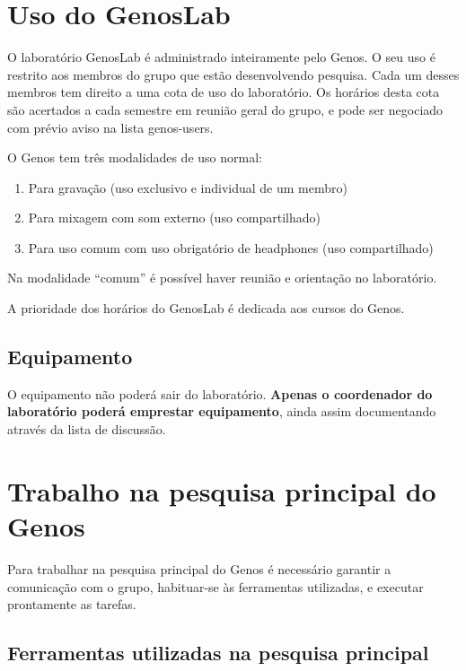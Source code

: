\documentclass[12pt,brazil]{book}
\begin{document}
\section{Uso do GenosLab}
\label{sec:uso-do-genoslab}

O laboratório GenosLab é administrado inteiramente pelo Genos. O seu
uso é restrito aos membros do grupo que estão desenvolvendo
pesquisa. Cada um desses membros tem direito a uma cota de uso do
laboratório. Os horários desta cota são acertados a cada semestre em
reunião geral do grupo, e pode ser negociado com prévio aviso na lista
genos-users.

O Genos tem três modalidades de uso normal:
\begin{enumerate}
\item Para gravação (uso exclusivo e individual de um membro)
\item Para mixagem com som externo (uso compartilhado)
\item Para uso comum com uso obrigatório de headphones (uso
  compartilhado)
\end{enumerate}

Na modalidade ``comum'' é possível haver reunião e orientação no
laboratório.

A prioridade dos horários do GenosLab é dedicada aos cursos do Genos.

\subsection{Equipamento}
\label{sec:equipamento}

O equipamento não poderá sair do laboratório. \textbf{Apenas o
  coordenador do laboratório poderá emprestar equipamento}, ainda
assim documentando através da lista de discussão.

\section{Trabalho na pesquisa principal do Genos}
\label{sec:trabalho-na-pesquisa}

Para trabalhar na pesquisa principal do Genos é necessário garantir a
comunicação com o grupo, habituar-se às ferramentas utilizadas, e
executar prontamente as tarefas.

\subsection{Ferramentas utilizadas na pesquisa principal}
\label{sec:ferr-util-na}
\end{document}
